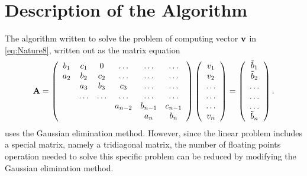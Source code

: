 \section{Description of the Algorithm}
\label{sec:DescriptionOfTheAlgorithm}
The algorithm written to solve the problem of computing vector $\mbox{\textbf{v}}$ in \eqref{eq:Nature8}, written out as the matrix equation
\begin{align*}
	\mbox{\textbf{A}} = \left(\begin{array}{cccccc}
                           b_1& c_1 & 0 &\dots   & \dots &\dots \\
                           a_2 & b_2 & c_2 &\dots &\dots &\dots \\
                           & a_3 & b_3 & c_3 & \dots & \dots \\
                           & \dots   & \dots &\dots   &\dots & \dots \\
                           &   &  &a_{n-2}  &b_{n-1}& c_{n-1} \\
                           &    &  &   &a_n & b_n \\
                      \end{array} \right)\left(\begin{array}{c}
                           v_1\\
                           v_2\\
                           \dots \\
                          \dots  \\
                          \dots \\
                           v_n\\
                      \end{array} \right)
  =\left(\begin{array}{c}
                           \tilde{b}_1\\
                           \tilde{b}_2\\
                           \dots \\
                           \dots \\
                          \dots \\
                           \tilde{b}_n\\
                      \end{array} \right).
\end{align*}
uses the Gaussian elimination method. However, since the linear problem includes a special matrix, namely a tridiagonal matrix, the number of floating points operation needed to solve this specific problem can be reduced by modifying the Gaussian elimination method.

